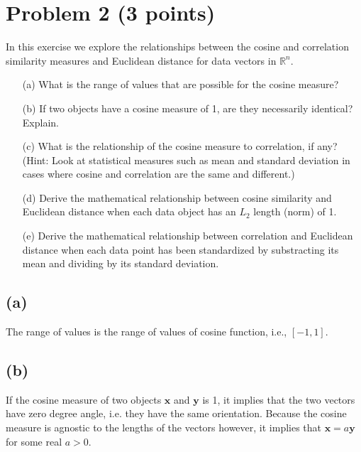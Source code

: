 \documentclass[10pt]{article}
\begin{document}
\color{blue}
\section*{Problem 2 (3 points)}
In this exercise we explore the relationships between the cosine and correlation similarity measures and Euclidean distance for data vectors in $\mathbb{R}^n$.

\begin{itemize}
\item[(a)] What is the range of values that are possible for the cosine measure?
\item[(b)] If two objects have a cosine measure of 1, are they necessarily identical? Explain.
\item[(c)] What is the relationship of the cosine measure to correlation, if any? (Hint: Look at statistical measures such as mean and standard deviation in cases where cosine and correlation are the same and different.)
\item[(d)] Derive the mathematical relationship between cosine similarity and Euclidean distance when each data object has an $L_2$ length (norm) of 1.
\item[(e)] Derive the mathematical relationship between correlation and Euclidean distance when each data point has been standardized by substracting its mean and dividing by its standard deviation.
\end{itemize}

\color{black}
\subsection*{(a)}
The range of values is the range of values of cosine function, i.e., $[-1, 1]$.

\subsection*{(b)}
If the cosine measure of two objects $\textbf{x}$ and $\textbf{y}$ is 1, it implies that the two vectors have zero degree angle, i.e. they have the same orientation. Because the cosine measure is agnostic to the lengths of the vectors however, it implies that $\textbf{x} = a\textbf{y}$ for some real $a > 0$.
\end{document}
